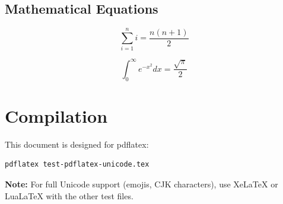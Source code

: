 \documentclass[12pt,a4paper]{article}
\begin{document}
\subsection{Mathematical Equations}
\begin{equation}
\sum_{i=1}^{n} i = \frac{n(n+1)}{2}
\end{equation}

\begin{equation}
\int_{0}^{\infty} e^{-x^2} dx = \frac{\sqrt{\pi}}{2}
\end{equation}

\section{Compilation}
This document is designed for pdflatex:
\begin{verbatim}
pdflatex test-pdflatex-unicode.tex
\end{verbatim}

\textbf{Note:} For full Unicode support (emojis, CJK characters), use XeLaTeX or LuaLaTeX with the other test files.
\end{document}
